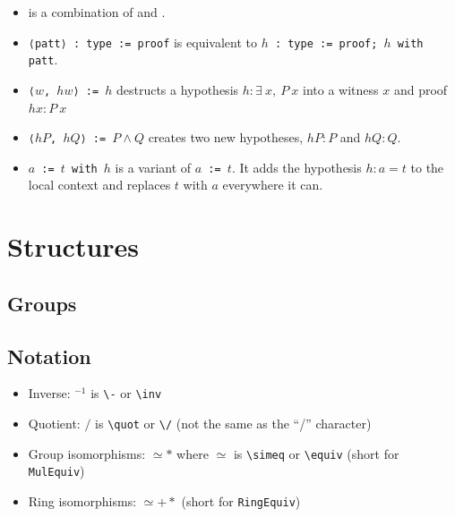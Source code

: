 \documentclass[a4paper]{article}
\begin{document}
\begin{itemize}
    \item \obtain is a combination of \have and \rcases.
    \item \texttt{\obtain ⟨patt⟩ : type := proof} is equivalent to
    \texttt{\have $h$ : type := proof; \rcases $h$ with patt}.
    \item \texttt{\obtain ⟨$w$, $hw$⟩ := $h$} destructs a hypothesis $h : \exists\ x,\ P\ x$ into a witness $x$ and proof $hx : P\ x$
    \item \texttt{\obtain ⟨$hP$, $hQ$⟩ := $P \wedge Q$} creates two new hypotheses, $hP : P$ and $hQ : Q$.
\end{itemize}



\begin{itemize}
    \item \texttt{\sset $a$ := $t$ with $h$} is a variant of \texttt{\llet $a$ := $t$}. It adds the hypothesis \texttt{$h : a = t$} to the local context and replaces $t$ with $a$ everywhere it can.
\end{itemize}

\section{Structures}

\subsection{Groups}

\subsection*{Notation}

\begin{itemize}
    \item Inverse: $^{-1}$ is \verb|\-| or \verb|\inv|
    \item Quotient: $/$ is \verb|\quot| or \verb|\/| (not the same as the ``/'' character)
    \item Group isomorphisms: $\simeq*$ where $\simeq$ is \verb|\simeq| or \verb|\equiv| (short for \texttt{MulEquiv})
    \item Ring isomorphisms: $\simeq+*$ (short for \texttt{RingEquiv})
\end{itemize}
\end{document}

